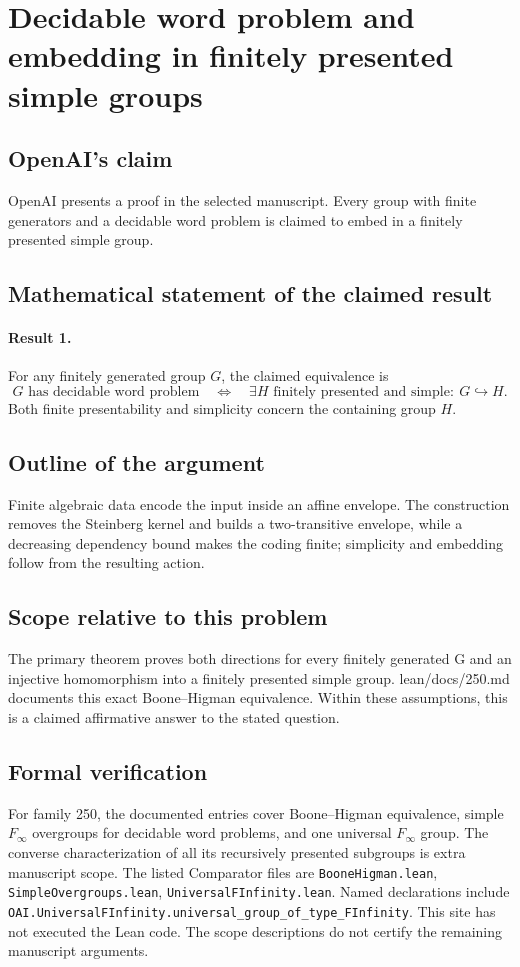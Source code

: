 \documentclass[11pt]{article}
\begin{document}
\section*{Decidable word problem and embedding in finitely presented simple groups}

\subsection{OpenAI's claim}
OpenAI presents a proof in the selected manuscript. Every group with finite generators and a decidable word problem is claimed to embed in a finitely presented simple group.

\subsection{Mathematical statement of the claimed result}
\paragraph{Result 1.} For any finitely generated group \(G\), the claimed equivalence is
\[
 G\text{ has decidable word problem}
 \quad\Longleftrightarrow\quad
 \exists H\text{ finitely presented and simple}:\ G\hookrightarrow H.
\]
Both finite presentability and simplicity concern the containing group \(H\).

\subsection{Outline of the argument}
Finite algebraic data encode the input inside an affine envelope. The construction removes the Steinberg kernel and builds a two-transitive envelope, while a decreasing dependency bound makes the coding finite; simplicity and embedding follow from the resulting action.

\subsection{Scope relative to this problem}
The primary theorem proves both directions for every finitely generated G and an injective homomorphism into a finitely presented simple group. lean/docs/250.md documents this exact Boone--Higman equivalence. Within these assumptions, this is a claimed affirmative answer to the stated question.

\subsection{Formal verification}
For family 250, the documented entries cover Boone--Higman equivalence, simple $F_\infty$ overgroups for decidable word problems, and one universal $F_\infty$ group. The converse characterization of all its recursively presented subgroups is extra manuscript scope. The listed Comparator files are \texttt{BooneHigman.lean}, \texttt{SimpleOvergroups.lean}, \texttt{UniversalFInfinity.lean}. Named declarations include \texttt{OAI.UniversalFInfinity.universal\_group\_of\_type\_FInfinity}. This site has not executed the Lean code. The scope descriptions do not certify the remaining manuscript arguments.
\end{document}
